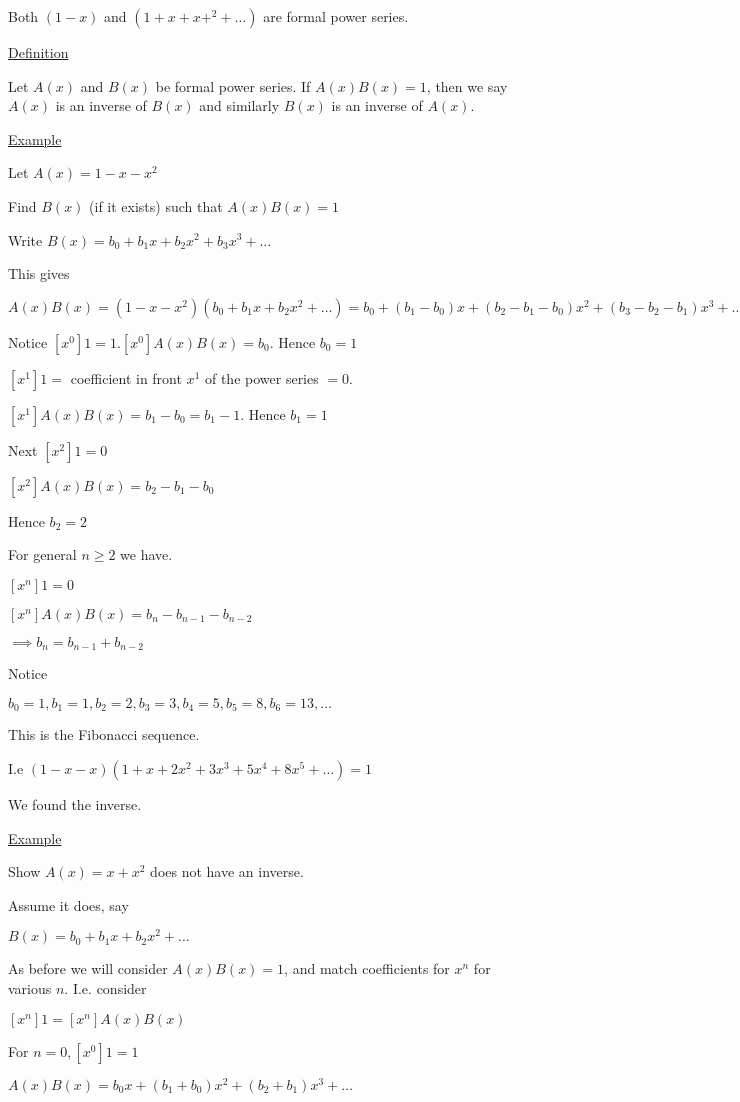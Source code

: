 \documentclass{article}
\begin{document}
Both $(1-x)$ and $(1+x+x+^2+\ldots)$ are formal power series. 

\underline{Definition}

Let $A(x)$ and $B(x)$ be formal power series. If $A(x)B(x)=1$, then we say $A(x)$ is an inverse of $B(x)$ and similarly $B(x)$ is an inverse of $A(x)$.

\underline{Example} 

Let $A(x) = 1-x-x^2$

Find $B(x)$ (if it exists) such that $A(x)B(x)=1$

Write $B(x) = b_0 + b_1x + b_2x^2 + b_3x^3 + \ldots$

This gives

$A(x)B(x) = (1-x-x^2)(b_0+b_1x+b_2x^2+\ldots) = b_0 + (b_1 - b_0)x + (b_2 - b_1 - b_0)x^2 + (b_3 - b_2 - b_1) x^3 + \ldots$

Notice $[x^0]1 = 1. [x^0]A(x)B(x)=b_0$. Hence $b_0 = 1$

$[x^1]1=$ coefficient in front $x^1$ of the power series $= 0$.

$[x^1]A(x)B(x)=b_1-b_0 = b_1-1$. Hence $b_1 = 1$

Next $[x^2]1 = 0$

$[x^2]A(x)B(x) = b_2-b_1-b_0$

Hence $b_2 = 2$

For general $n \ge 2$ we have.

$[x^n]1=0$

$[x^n]A(x)B(x) = b_n - b_{n-1}-b_{n-2}$

$\implies b_n = b_{n-1} + b_{n-2}$

Notice

$b_0=1, b_1=1,b_2=2, b_3=3, b_4=5, b_5=8, b_6=13,\ldots$

This is the Fibonacci sequence. 

I.e $(1-x-x)(1+x+2x^2+3x^3+5x^4+8x^5+\ldots) = 1$

We found the inverse.

\underline{Example}

Show $A(x)=x+x^2$ does not have an inverse.

Assume it does, say

$B(x)=b_0+b_1x+b_2x^2+\ldots$

As before we will consider $A(x)B(x)=1$, and match coefficients for $x^n$ for various $n$. I.e. consider

$[x^n]1 = [x^n]A(x)B(x)$

For $n=0, [x^0]1=1$

$A(x)B(x) = b_0x + (b_1 + b_0)x^2 + (b_2+b_1)x^3+\ldots$
\end{document}
